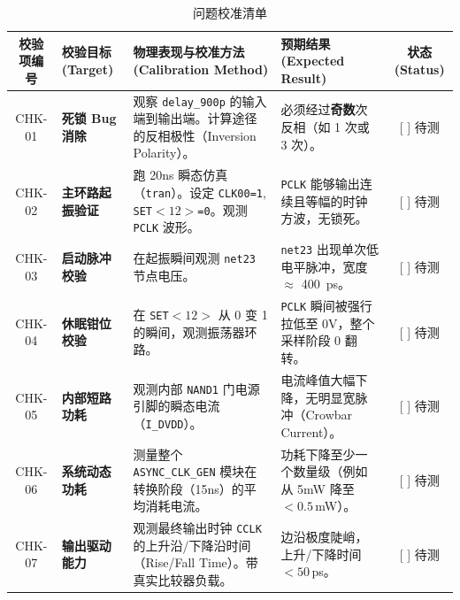 \documentclass[11pt,a4paper,UTF8]{ctexart}
\begin{document}
\begin{table}[htbp]
\centering
\caption{问题校准清单}
\label{tab:checklist}
\begin{tabular}{|c|p{2.8cm}|p{5cm}|p{3.5cm}|c|}
\toprule
\textbf{校验项编号} & \textbf{校验目标 (Target)} & \textbf{物理表现与校准方法 (Calibration Method)} & \textbf{预期结果 (Expected Result)} & \textbf{状态 (Status)} \\
\midrule
CHK-01 & \textbf{死锁 Bug 消除} & 观察 \texttt{delay\_900p} 的输入端到输出端。计算途径的反相极性（Inversion Polarity）。 & 必须经过\textbf{奇数}次反相（如 1 次或 3 次）。 & [ ] 待测 \\
\midrule
CHK-02 & \textbf{主环路起振验证} & 跑 20ns 瞬态仿真（\texttt{tran}）。设定 \texttt{CLK00=1}, \texttt{SET$<12> $=0}。观测 \texttt{PCLK} 波形。 & \texttt{PCLK} 能够输出连续且等幅的时钟方波，无锁死。 & [ ] 待测 \\
\midrule
CHK-03 & \textbf{启动脉冲校验} & 在起振瞬间观测 \texttt{net23} 节点电压。 & \texttt{net23} 出现单次低电平脉冲，宽度 $\approx$ \SI{400}{ps}。 & [ ] 待测 \\
\midrule
CHK-04 & \textbf{休眠钳位校验} & 在 \texttt{SET$<12>$} 从 0 变 1 的瞬间，观测振荡器环路。 & \texttt{PCLK} 瞬间被强行拉低至 0V，整个采样阶段 0 翻转。 & [ ] 待测 \\
\midrule
CHK-05 & \textbf{内部短路功耗} & 观测内部 \texttt{NAND1} 门电源引脚的瞬态电流（\texttt{I\_DVDD}）。 & 电流峰值大幅下降，无明显宽脉冲（Crowbar Current）。 & [ ] 待测 \\
\midrule
CHK-06 & \textbf{系统动态功耗} & 测量整个 \texttt{ASYNC\_CLK\_GEN} 模块在转换阶段（15ns）的平均消耗电流。 & 功耗下降至少一个数量级（例如从 5mW 降至 $< 0.5\,$mW）。 & [ ] 待测 \\
\midrule
CHK-07 & \textbf{输出驱动能力} & 观测最终输出时钟 \texttt{CCLK} 的上升沿/下降沿时间（Rise/Fall Time）。带真实比较器负载。 & 边沿极度陡峭，上升/下降时间 $< 50\,$ps。 & [ ] 待测 \\
\bottomrule
\end{tabular}
\end{table}
\end{document}
